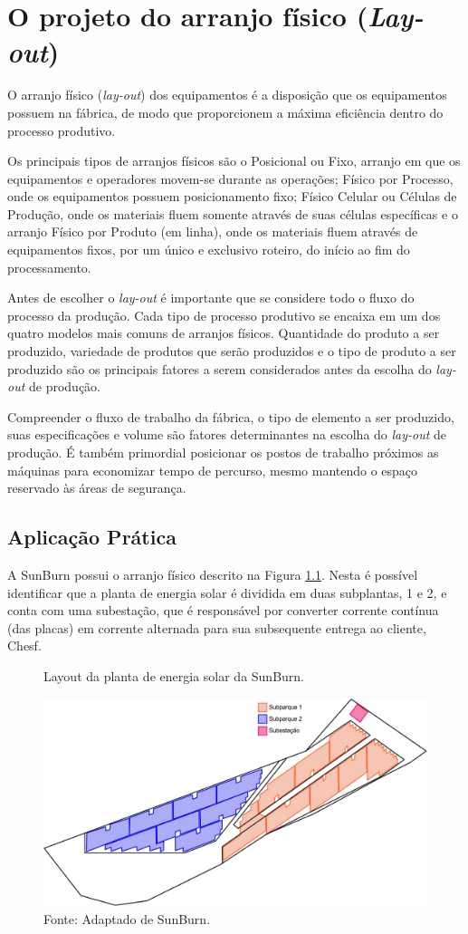 \chapter{O projeto do arranjo físico (\textit{Lay-out})}
\label{chap:projeto_do_arranjo}
O arranjo físico (\textit{lay-out}) dos equipamentos é a disposição que os equipamentos possuem na fábrica, de modo que proporcionem a máxima eficiência dentro do processo produtivo.

Os principais tipos de arranjos físicos são o Posicional ou Fixo, arranjo em que os equipamentos e operadores movem-se durante as operações; Físico por Processo, onde os equipamentos possuem posicionamento fixo; Físico Celular ou Células de Produção, onde os materiais fluem somente através de suas células específicas e o arranjo Físico por Produto (em linha), onde os materiais fluem através de equipamentos fixos, por um único e exclusivo roteiro, do início ao fim do processamento.

Antes de escolher o \textit{lay-out} é importante que se considere todo o fluxo do processo da produção. Cada tipo de processo produtivo se encaixa em um dos quatro modelos mais comuns de arranjos físicos. Quantidade do produto a ser produzido, variedade de produtos que serão produzidos e o tipo de produto a ser produzido são os principais fatores a serem considerados antes da escolha do \textit{lay-out} de produção.

Compreender o fluxo de trabalho da fábrica, o tipo de elemento a ser produzido, suas especificações e volume são fatores determinantes na escolha do \textit{lay-out} de produção. É também primordial posicionar os postos de trabalho próximos as máquinas para economizar tempo de percurso, mesmo mantendo o espaço reservado às áreas de segurança.

\section{Aplicação Prática}
\label{sec:projeto_do_arranjo_aplicacao}
A SunBurn possui o arranjo físico descrito na Figura \ref{fig:arranjo_fisico_aplicacao}. Nesta é possível identificar que a planta de energia solar é dividida em duas subplantas, 1 e 2, e conta com uma subestação, que é responsável por converter corrente contínua (das placas) em corrente alternada para sua subsequente entrega ao cliente, Chesf.


\begin{figure}[H]
    \caption{Layout da planta de energia solar da SunBurn.}
    \includegraphics[width=1\textwidth]{images/layout.jpg}
    \caption*{Fonte: Adaptado de SunBurn.}
    \label{fig:arranjo_fisico_aplicacao}
  \end{figure}